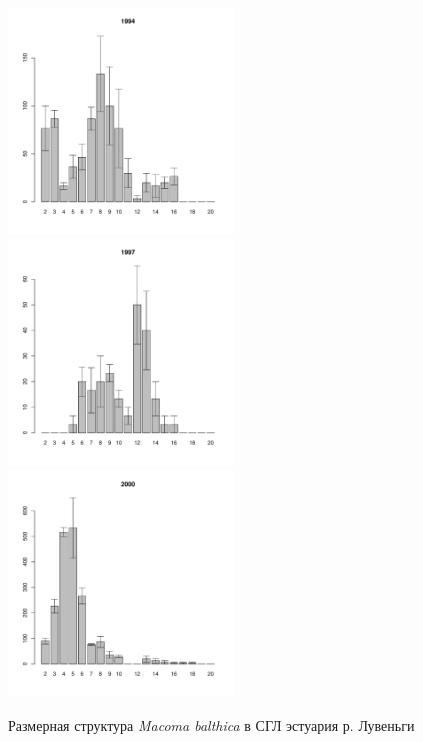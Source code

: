 \documentclass[12pt, a4paper]{article}
\begin{document}
\begin{figure}[h]
\begin{multicols}{3}
\hfill
\includegraphics[width=60mm]{../White_Sea/Estuatiy_Luvenga/sizestr2_1994_.pdf}
\hfill
\includegraphics[width=60mm]{../White_Sea/Estuatiy_Luvenga/sizestr2_1997_.pdf}
\hfill
\includegraphics[width=60mm]{../White_Sea/Estuatiy_Luvenga/sizestr2_2000_.pdf}
\end{multicols}



\caption{Размерная структура {\it Macoma balthica} в СГЛ эстуария р. Лувеньги}
\label{ris:size_str_estuary_Luv}
\end{figure}
\end{document}
